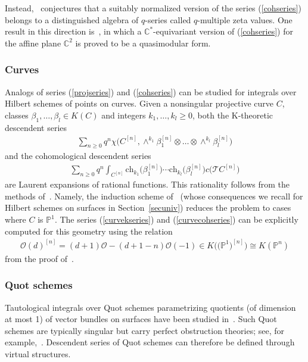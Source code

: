 \documentclass[pdftex]{sigma}
\numberwithin{equation}{section}
\def\O{\mathcal{O}}
\newcommand{\ch}{\mathrm{ch}}
\def\C{\mathbb C}
\def\P{\mathbb P}
\begin{document}
Instead,~\cite[Conjecture 2]{O} conjectures that a suitably normalized version of the series (\ref{cohseries}) belongs to a distinguished algebra of $q$-series called $q$-multiple zeta values. One result in this direction is~\cite[Theorem~2]{C}, in which a $\C^*$-equivariant version of (\ref{cohseries}) for the affine plane $\C^2$ is proved to be a quasimodular form.


\subsubsection{Curves}

Analogs of series (\ref{projseries}) and (\ref{cohseries}) can be studied for integrals over Hilbert schemes of points on curves. Given a nonsingular projective curve $C$, classes $\beta_1,\dots,\beta_l\in K(C)$ and integers $k_1,\dots,k_l\geq 0$, both the K-theoretic descendent series \begin{align}\label{curvekseries}
\sum_{n\geq 0} q^n \chi\big({C^{[n]}}, \wedge^{k_1}\beta_1^{[n]}\otimes \dots \otimes\wedge^{k_l}\beta_l^{[n]}\big)
\end{align}
and the cohomological descendent series
\begin{align}\label{curvecohseries}
\sum_{n\geq 0} q^n \int_{C^{[n]}} \ch_{k_1}\big(\beta_1^{[n]}\big)\cdots \ch_{k_l}\big(\beta_l^{[n]}\big) c\big(\mathcal{T}C^{[n]}\big)
\end{align}
are Laurent expansions of rational functions. This rationality follows from the methods of~\cite[Section~2.3]{OP}. Namely, the induction scheme of~\cite{EGL} (whose consequences we recall for Hilbert schemes on surfaces in Section~\ref{secuniv}) reduces the problem to cases where $C$ is $\P^1$. The series (\ref{curvekseries}) and (\ref{curvecohseries}) can be explicitly computed for this geometry using the relation
\begin{gather*}
\O(d)^{[n]}=(d+1)\O-(d+1-n)\O(-1)\in K\big(\big(\P^1\big)^{[n]}\big)\cong K(\P^n)
\end{gather*}
from the proof of~\cite[Theorem~2]{MOP2}.


\subsubsection{Quot schemes}
Tautological integrals over Quot schemes
parametrizing quotients (of dimension at most 1) of vector bundles on surfaces have been studied in~\cite{AJLOP,B2,B1,JOP,St1,St2}. Such Quot schemes are typically singular but carry perfect obstruction theories; see, for example,~\cite[Section~4]{St2}. Descendent series of Quot schemes can therefore be defined through virtual structures.
\end{document}
